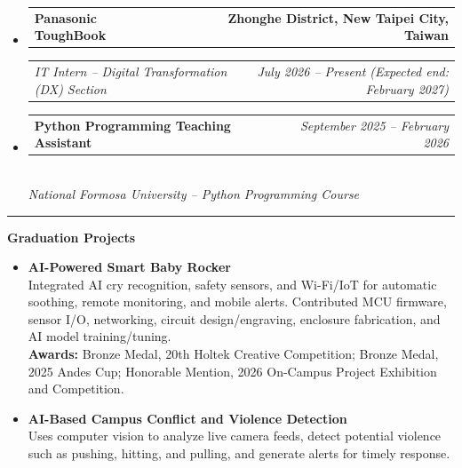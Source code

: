 \documentclass[10pt,letterpaper]{article}
\makeatletter
\newcommand{\resumesection}[1]{%
    \par\vspace{2pt}\hrule\vspace{2pt}%
    {\noindent\large\bfseries #1\par}\vspace{1pt}%
}
\newcommand{\headerrow}[2]
{\begin{tabular*}{\linewidth}{l@{\extracolsep{\fill}}r}
#1 &
#2 \\
\end{tabular*}}
\makeatother
\begin{document}
\renewcommand\labelitemi{}
\renewcommand\labelitemii{$\bullet$}
\begin{itemize}[leftmargin=1em]
	\parskip=0.1em
    
    
	\item
	      \headerrow
	      {\textbf{Panasonic ToughBook}}
	      {\textbf{Zhonghe District, New Taipei City, Taiwan}}
	      \headerrow
	      {\emph{IT Intern -- Digital Transformation (DX) Section}}
	      {\emph{July 2026 -- Present (Expected end: February 2027)}}

    \item
          \headerrow
          {\textbf{Python Programming Teaching Assistant}}
          {\emph{September 2025 -- February 2026}}
          \\{\emph{National Formosa University -- Python Programming Course}}
\end{itemize}

\resumesection{Graduation Projects}
\begin{itemize}[leftmargin=1em,noitemsep]
    \item \textbf{AI-Powered Smart Baby Rocker}
    \\Integrated AI cry recognition, safety sensors, and Wi-Fi/IoT for automatic soothing, remote monitoring, and mobile alerts. Contributed MCU firmware, sensor I/O, networking, circuit design/engraving, enclosure fabrication, and AI model training/tuning.
    \\{\small\textbf{Awards:} Bronze Medal, 20th Holtek Creative Competition; Bronze Medal, 2025 Andes Cup; Honorable Mention, 2026 On-Campus Project Exhibition and Competition.}
    \item \textbf{AI-Based Campus Conflict and Violence Detection}
    \\Uses computer vision to analyze live camera feeds, detect potential violence such as pushing, hitting, and pulling, and generate alerts for timely response.
\end{itemize}
\end{document}
